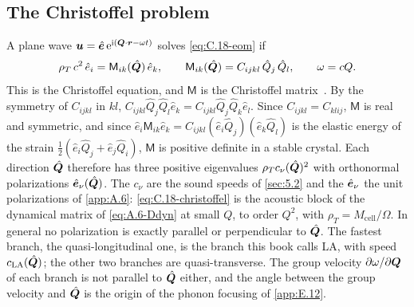 \subsection{The Christoffel problem}

A plane wave $\bm{u} = \hat{\bm{e}}\,\mathrm{e}^{\mathrm{i}(\bm{Q}\cdot\bm{r} - \omega t)}$ solves \cref{eq:C.18-eom} if
\begin{equation}
  \rho_T\,c^2\,\hat e_i = \mathsf{M}_{ik}(\hat{\bm{Q}})\,\hat e_k, \qquad
  \mathsf{M}_{ik}(\hat{\bm{Q}}) = C_{ijkl}\,\hat Q_j\,\hat Q_l, \qquad \omega = cQ .
  \label{eq:C.18-christoffel}
\end{equation}
This is the Christoffel equation, and $\mathsf{M}$ is the Christoffel matrix~\cite{landau1986theory}. By the symmetry of $C_{ijkl}$ in $kl$, $C_{ijkl}\hat Q_j\hat Q_l\hat e_k = C_{ijkl}\hat Q_j\hat Q_k\hat e_l$. Since $C_{ijkl} = C_{klij}$, $\mathsf{M}$ is real and symmetric, and since $\hat e_i\mathsf{M}_{ik}\hat e_k = C_{ijkl}(\hat e_i\hat Q_j)(\hat e_k\hat Q_l)$ is the elastic energy of the strain $\tfrac12(\hat e_i\hat Q_j + \hat e_j\hat Q_i)$, $\mathsf{M}$ is positive definite in a stable crystal. Each direction $\hat{\bm{Q}}$ therefore has three positive eigenvalues $\rho_Tc_\nu(\hat{\bm{Q}})^2$ with orthonormal polarizations $\hat{\bm{e}}_\nu(\hat{\bm{Q}})$. The $c_\nu$ are the sound speeds of \cref{sec:5.2} and the $\hat{\bm{e}}_\nu$ the unit polarizations of \cref{app:A.6}: \cref{eq:C.18-christoffel} is the acoustic block of the dynamical matrix of \cref{eq:A.6-Ddyn} at small $Q$, to order $Q^2$, with $\rho_T = M_{\mathrm{cell}}/\Omega$. In general no polarization is exactly parallel or perpendicular to $\hat{\bm{Q}}$. The fastest branch, the quasi-longitudinal one, is the branch this book calls LA, with speed $c_{\mathrm{LA}}(\hat{\bm{Q}})$; the other two branches are quasi-transverse. The group velocity $\partial\omega/\partial\bm{Q}$ of each branch is not parallel to $\hat{\bm{Q}}$ either, and the angle between the group velocity and $\hat{\bm{Q}}$ is the origin of the phonon focusing of \cref{app:E.12}.

